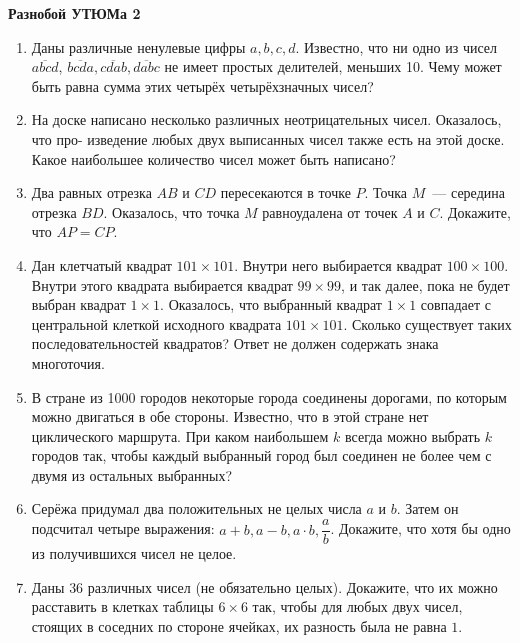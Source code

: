 \documentclass{article}
\begin{document}
\large
	
\begin{center}
	\textbf{Разнобой УТЮМа 2}
\end{center}


\begin{enumerate}[label*=\protect\fbox{\arabic{enumi}}]
	
\item Даны различные ненулевые цифры $a, b, c, d$. Известно, что ни одно из чисел $\overline{abcd}$, $\overline{bcda}, \overline{cdab}, \overline{dabc}$ не имеет простых делителей, меньших 10. Чему может быть равна сумма этих четырёх четырёхзначных чисел?

\item На доске написано несколько различных неотрицательных чисел. Оказалось, что про- изведение любых двух выписанных чисел также есть на этой доске. Какое наибольшее количество чисел может быть написано?

\item Два равных отрезка $AB$ и $CD$ пересекаются в точке $P$. Точка $M$~--- середина отрезка $BD$. Оказалось, что точка $M$ равноудалена от точек $A$ и $C$. Докажите, что $AP = CP$.

\item Дан клетчатый квадрат $101\times 101$. Внутри него выбирается квадрат $100\times 100$. Внутри этого квадрата выбирается квадрат $99 \times 99$, и так далее, пока не будет выбран квадрат $1\times 1$. Оказалось, что выбранный квадрат $1\times1$ совпадает с центральной клеткой исходного квадрата $101 \times 101$. Сколько существует таких последовательностей квадратов? Ответ не должен содержать знака многоточия.

\item В стране из 1000 городов некоторые города соединены дорогами, по которым можно двигаться в обе стороны. Известно, что в этой стране нет циклического маршрута. При каком наибольшем $k$ всегда можно выбрать $k$ городов так, чтобы каждый выбранный город был соединен не более чем с двумя из остальных выбранных?

\item Серёжа придумал два положительных не целых числа $a$ и $b$. Затем он подсчитал четыре выражения: $a+b, a-b, a\cdot b, \dfrac{a}{b}$. Докажите, что хотя бы одно из получившихся чисел не целое.

\item Даны $36$ различных чисел (не обязательно целых). Докажите, что их можно расставить в клетках таблицы $6 \times 6$ так, чтобы для любых двух чисел, стоящих в соседних по стороне ячейках, их разность была не равна $1$.


\end{enumerate}
\end{document}
